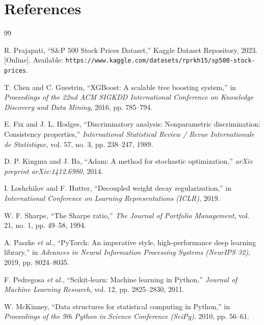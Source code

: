 \documentclass{article}
\begin{document}
\newpage

\section{References}
\begin{thebibliography}{99}

R. Prajapati, ``S\&P 500 Stock Prices Dataset,'' Kaggle Dataset Repository, 2023. [Online]. Available: \texttt{https://www.kaggle.com/datasets/rprkh15/sp500-stock-prices}.

T. Chen and C. Guestrin, ``XGBoost: A scalable tree boosting system,'' in \textit{Proceedings of the 22nd ACM SIGKDD International Conference on Knowledge Discovery and Data Mining}, 2016, pp. 785--794.

E. Fix and J. L. Hodges, ``Discriminatory analysis: Nonparametric discrimination: Consistency properties,'' \textit{International Statistical Review / Revue Internationale de Statistique}, vol. 57, no. 3, pp. 238--247, 1989.

D. P. Kingma and J. Ba, ``Adam: A method for stochastic optimization,'' \textit{arXiv preprint arXiv:1412.6980}, 2014.

I. Loshchilov and F. Hutter, ``Decoupled weight decay regularization,'' in \textit{International Conference on Learning Representations (ICLR)}, 2019.

W. F. Sharpe, ``The Sharpe ratio,'' \textit{The Journal of Portfolio Management}, vol. 21, no. 1, pp. 49--58, 1994.

A. Paszke \textit{et al.}, ``PyTorch: An imperative style, high-performance deep learning library,'' in \textit{Advances in Neural Information Processing Systems (NeurIPS 32)}, 2019, pp. 8024--8035.

F. Pedregosa \textit{et al.}, ``Scikit-learn: Machine learning in Python,'' \textit{Journal of Machine Learning Research}, vol. 12, pp. 2825--2830, 2011.

W. McKinney, ``Data structures for statistical computing in Python,'' in \textit{Proceedings of the 9th Python in Science Conference (SciPy)}, 2010, pp. 56--61.

\end{thebibliography}
\end{document}
